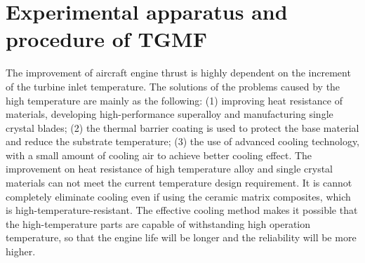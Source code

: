 \chapter{Experimental apparatus and procedure of TGMF}
The improvement of aircraft engine thrust is highly dependent on the increment of the turbine inlet temperature.
The solutions of the problems caused by the high temperature are mainly as the following:
(1) improving heat resistance of materials, developing high-performance superalloy and manufacturing single crystal blades;
(2) the thermal barrier coating is used to protect the base material and reduce the substrate temperature;
(3) the use of advanced cooling technology, with a small amount of cooling air to achieve better cooling effect.
The improvement on heat resistance of high temperature alloy and single crystal materials can not meet the current temperature design requirement. It is cannot completely eliminate cooling even if using the ceramic matrix composites, which is high-temperature-resistant. The effective cooling method makes it possible that the high-temperature parts are capable of withstanding high operation temperature, so that the engine life will be longer and the reliability will be more higher.

